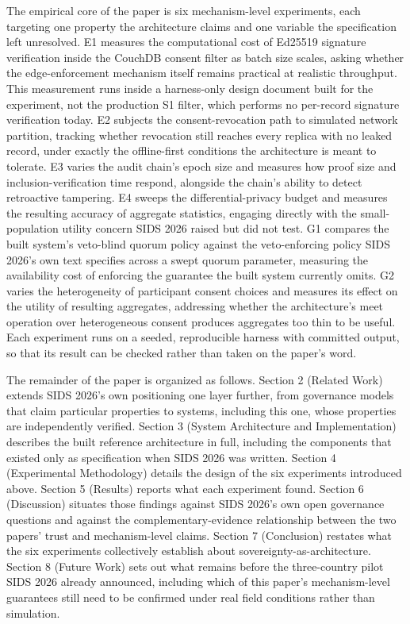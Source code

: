 The empirical core of the paper is six mechanism-level experiments, each targeting one property the architecture claims and one variable the specification left unresolved. E1 measures the computational cost of Ed25519 signature verification inside the CouchDB consent filter as batch size scales, asking whether the edge-enforcement mechanism itself remains practical at realistic throughput. This measurement runs inside a harness-only design document built for the experiment, not the production S1 filter, which performs no per-record signature verification today. E2 subjects the consent-revocation path to simulated network partition, tracking whether revocation still reaches every replica with no leaked record, under exactly the offline-first conditions the architecture is meant to tolerate. E3 varies the audit chain's epoch size and measures how proof size and inclusion-verification time respond, alongside the chain's ability to detect retroactive tampering. E4 sweeps the differential-privacy budget and measures the resulting accuracy of aggregate statistics, engaging directly with the small-population utility concern SIDS 2026 raised but did not test. G1 compares the built system's veto-blind quorum policy against the veto-enforcing policy SIDS 2026's own text specifies across a swept quorum parameter, measuring the availability cost of enforcing the guarantee the built system currently omits. G2 varies the heterogeneity of participant consent choices and measures its effect on the utility of resulting aggregates, addressing whether the architecture's meet operation over heterogeneous consent produces aggregates too thin to be useful. Each experiment runs on a seeded, reproducible harness with committed output, so that its result can be checked rather than taken on the paper's word.

The remainder of the paper is organized as follows. Section 2 (Related Work) extends SIDS 2026's own positioning one layer further, from governance models that claim particular properties to systems, including this one, whose properties are independently verified. Section 3 (System Architecture and Implementation) describes the built reference architecture in full, including the components that existed only as specification when SIDS 2026 was written. Section 4 (Experimental Methodology) details the design of the six experiments introduced above. Section 5 (Results) reports what each experiment found. Section 6 (Discussion) situates those findings against SIDS 2026's own open governance questions and against the complementary-evidence relationship between the two papers' trust and mechanism-level claims. Section 7 (Conclusion) restates what the six experiments collectively establish about sovereignty-as-architecture. Section 8 (Future Work) sets out what remains before the three-country pilot SIDS 2026 already announced, including which of this paper's mechanism-level guarantees still need to be confirmed under real field conditions rather than simulation.
